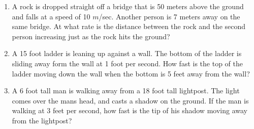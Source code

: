 \documentclass{article}
\begin{document}
\begin{enumerate}
\item A rock is dropped straight off a bridge that is 50 meters above the ground and falls at a speed of 10 $m$/sec.  Another person is 7 meters away on the same bridge.  At what rate is the distance between the rock and the second person increasing just as the rock hits the ground?
\item A 15 foot ladder is leaning up against a wall. The bottom of the ladder is sliding away form the wall at 1 foot per second. How fast is the top of the ladder moving down the wall when the bottom is 5 feet away from the wall?
\item A 6 foot tall man is walking away from a 18 foot tall lightpost. The light comes over the mans head, and casts a shadow on the ground. If the man is walking at 3 feet per second, how fast is the tip of his shadow moving away from the lightpost?
\end{enumerate}
\end{document}
